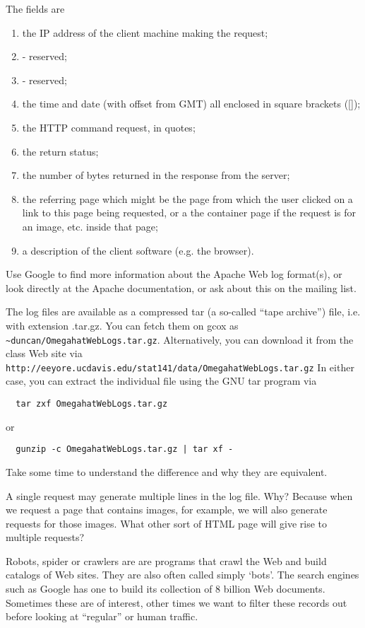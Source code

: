 \documentclass[12pt]{article}
\begin{document}
The fields are
\begin{enumerate}
\item the IP address of the client machine making the request;
\item -  reserved;
\item -  reserved;
\item the time and date (with offset from GMT) all enclosed in square
  brackets ([]);
\item the HTTP command request, in quotes;
\item the return status;
\item the number of bytes returned in the response from the server;
\item the referring page which might be the page from which  the user
  clicked on a link to this page being requested, or a the container
  page if the request is for an image, etc. inside that page;
\item a description of the client software (e.g. the browser).
\end{enumerate}
Use Google to find more information about the Apache
Web log format(s), or look directly at the Apache documentation,
or ask about this on the mailing list.

The log files are available as a compressed tar (a so-called ``tape archive'') file, i.e. with 
extension .tar.gz.
You can fetch them  on gcox as 
\verb+~duncan/OmegahatWebLogs.tar.gz+.
Alternatively, you can download it from 
the class Web site via
\verb+http://eeyore.ucdavis.edu/stat141/data/OmegahatWebLogs.tar.gz+
In either case, you can extract the individual file using
the GNU tar program via
\begin{verbatim}
  tar zxf OmegahatWebLogs.tar.gz
\end{verbatim}
or
\begin{verbatim}
  gunzip -c OmegahatWebLogs.tar.gz | tar xf -
\end{verbatim}
Take some time to understand the difference and why they are equivalent.



A single request may generate multiple lines in the log
file. Why? Because when we request a page that contains images, for 
example, we will also generate requests for those images.
What other sort of HTML page will give rise to multiple
requests? 

Robots, spider or crawlers are are programs that crawl the Web and
build catalogs of Web sites. They are also often called simply `bots'.
The search engines such as Google has one to build its collection of 8
billion Web documents.  Sometimes these are of interest, other times
we want to filter these records out before looking at ``regular'' or
human traffic.
\end{document}
